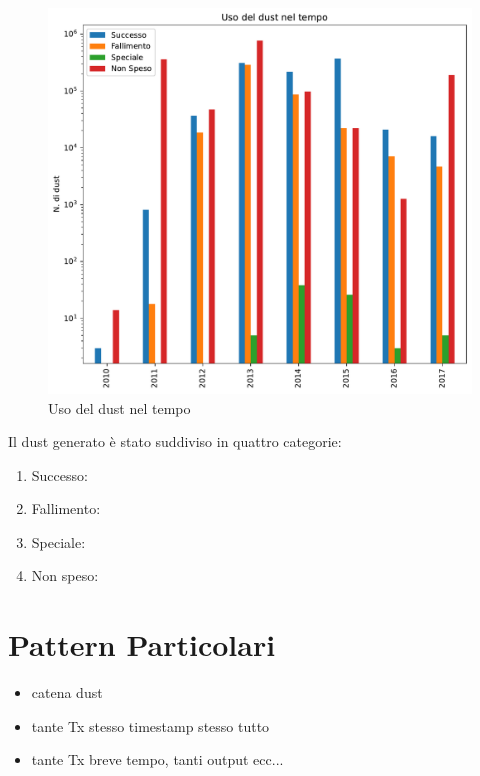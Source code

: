 \begin{figure}[h!]
    \centering
    \includegraphics[scale=0.7]{Grafici/uso_del_dust_new.pdf}
    \caption{Uso del dust nel tempo}
    \label{fig:dust_year}
\end{figure}
\FloatBarrier
Il dust generato è stato suddiviso in quattro categorie:
\begin{enumerate}
    \item Successo:
    \item Fallimento:
    \item Speciale:
    \item  Non speso:
\end{enumerate}

\section{Pattern Particolari}
\begin{itemize}
    \item catena dust
    \item tante Tx stesso timestamp stesso tutto
    \item tante Tx breve tempo, tanti output ecc...
\end{itemize}